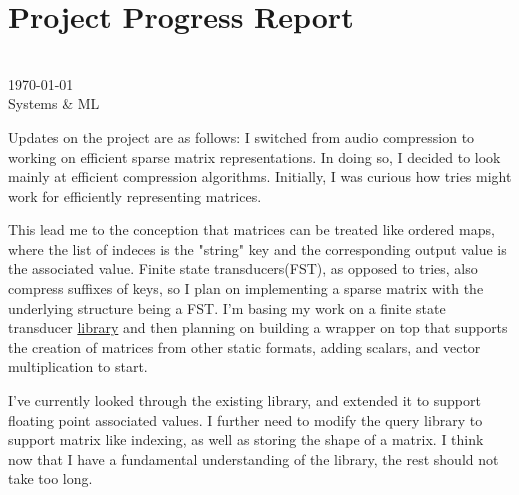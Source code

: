 \documentclass[12pt]{report}
\begin{document}
\section*{Project Progress Report}
\author*{Julian Knodt} \\
\today \\
Systems \& ML

Updates on the project are as follows:
I switched from audio compression to working on efficient sparse matrix representations. In
doing so, I decided to look mainly at efficient compression algorithms. Initially, I was curious
how tries might work for efficiently representing matrices.

This lead me to the conception that matrices can be treated like ordered maps, where the list of
indeces is the "string" key and the corresponding output value is the associated value. Finite
state transducers(FST), as opposed to tries, also compress suffixes of keys, so I plan on
implementing a sparse matrix with the underlying structure being a FST. I'm basing my work on a
finite state transducer \href{https://github.com/BurntSushi/fst/tree/master/src}{library} and
then planning on building a wrapper on top that supports the creation of matrices from other
static formats, adding scalars, and vector multiplication to start.

I've currently looked through the existing library, and extended it to support floating point
associated values. I further need to modify the query library to support matrix like indexing,
as well as storing the shape of a matrix. I think now that I have a fundamental understanding of
the library, the rest should not take too long.
\end{document}
